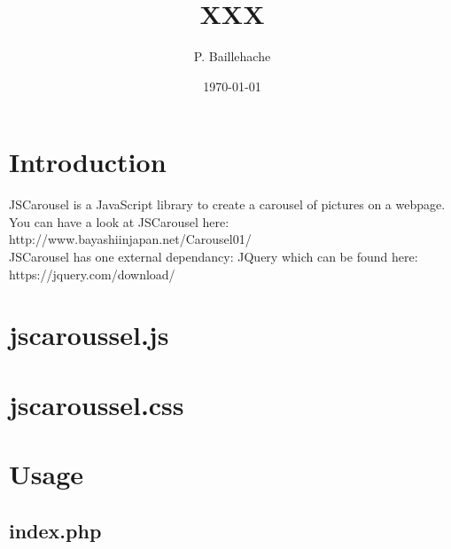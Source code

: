\documentclass[12pt, a4paper]{article}
\begin{document}
\title{XXX}
\author{P. Baillehache}
\date{\today}
\maketitle

\tableofcontents

\section*{Introduction}

JSCarousel is a JavaScript library to create a carousel of pictures on a webpage.\\

You can have a look at JSCarousel here: http://www.bayashiinjapan.net/Carousel01/\\

JSCarousel has one external dependancy: JQuery which can be found here: https://jquery.com/download/\\

\section{jscaroussel.js}

\begin{scriptsize}
\begin{ttfamily}

\end{ttfamily}
\end{scriptsize}

\section{jscaroussel.css}

\begin{scriptsize}
\begin{ttfamily}

\end{ttfamily}
\end{scriptsize}

\section{Usage}

\subsection{index.php}

\begin{scriptsize}
\begin{ttfamily}

\end{ttfamily}
\end{scriptsize}
\end{document}
